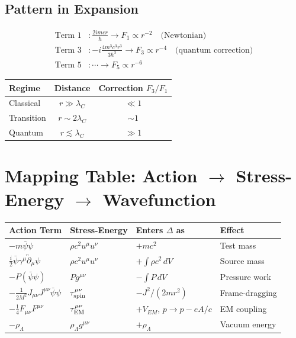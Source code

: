 \documentclass[11pt,a4paper]{article}
\theoremstyle{definition}
\theoremstyle{remark}
\begin{document}
	\subsection{Pattern in Expansion}
	
	\begin{align}
		\text{Term 1} &: \frac{2imcr}{\hbar} \to F_1 \propto r^{-2} \quad\text{(Newtonian)} \\
		\text{Term 3} &: -i\frac{4m^3c^3r^3}{3\hbar^3} \to F_3 \propto r^{-4} \quad\text{(quantum correction)} \\
		\text{Term 5} &: \cdots \to F_5 \propto r^{-6}
	\end{align}
	
	\begin{table}[h]
		\centering
		\begin{tabular}{lcc}
			\toprule
			Regime & Distance & Correction $F_3/F_1$ \\
			\midrule
			Classical   & $r\gg\lambda_C$ & $\ll1$ \\
			Transition  & $r\sim2\lambda_C$ & $\sim1$ \\
			Quantum     & $r\lesssim\lambda_C$ & $\gg1$ \\
			\bottomrule
		\end{tabular}
	\end{table}
	
	\section{Mapping Table: Action $\to$ Stress-Energy $\to$ Wavefunction}
	
	\begin{center}
		\begin{tabular}{|l|l|l|l|}
			\hline
			\textbf{Action Term} & \textbf{Stress-Energy} & \textbf{Enters $\Delta$ as} & \textbf{Effect} \\
			\hline
			$-m\bar{\psi}\psi$ & $\rho c^2 u^\mu u^\nu$ & $+mc^2$ & Test mass \\
			$\frac{i}{2}\bar{\psi}\gamma^\mu\overleftrightarrow{\partial}_\mu\psi$ & $\rho c^2 u^\mu u^\nu$ & $+\int\rho c^2\,dV$ & Source mass \\
			$-P(\bar{\psi}\psi)$ & $Pg^{\mu\nu}$ & $-\int P\,dV$ & Pressure work \\
			$-\frac{1}{2M^2}J_{\mu\nu}J^{\mu\nu}\bar{\psi}\psi$ & $\tau^{\mu\nu}_{\rm spin}$ & $-J^2/(2mr^2)$ & Frame-dragging \\
			$-\frac{1}{4}F_{\mu\nu}F^{\mu\nu}$ & $\tau^{\mu\nu}_{\rm EM}$ & $+V_{EM}$, $p\to p-eA/c$ & EM coupling \\
			$-\rho_\Lambda$ & $\rho_\Lambda g^{\mu\nu}$ & $+\rho_\Lambda$ & Vacuum energy \\
			\hline
		\end{tabular}
	\end{center}
	
\end{document}
